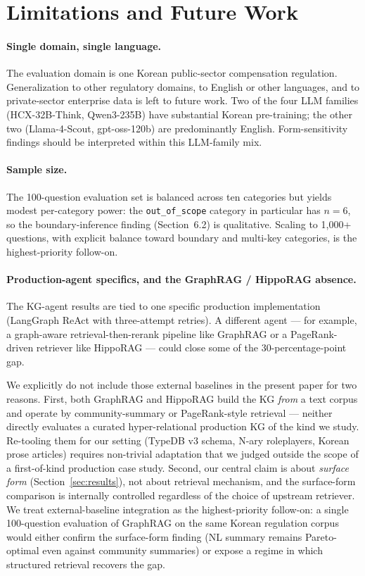 \section{Limitations and Future Work}\label{sec:limits}

\paragraph{Single domain, single language.}
The evaluation domain is one Korean public-sector compensation
regulation. Generalization to other regulatory domains, to English
or other languages, and to private-sector enterprise data is left to
future work. Two of the four LLM families (HCX-32B-Think, Qwen3-235B)
have substantial Korean pre-training; the other two (Llama-4-Scout,
gpt-oss-120b) are predominantly English. Form-sensitivity findings
should be interpreted within this LLM-family mix.

\paragraph{Sample size.}
The 100-question evaluation set is balanced across ten categories
but yields modest per-category power: the
\texttt{out\_of\_scope} category in particular has $n=6$, so the
boundary-inference finding (Section~6.2) is qualitative. Scaling
to 1{,}000+ questions, with explicit balance toward boundary and
multi-key categories, is the highest-priority follow-on.

\paragraph{Production-agent specifics, and the GraphRAG / HippoRAG
absence.}
The KG-agent results are tied to one specific production
implementation (LangGraph ReAct with three-attempt retries). A
different agent — for example, a graph-aware retrieval-then-rerank
pipeline like GraphRAG \citep{edge2024graphrag} or a
PageRank-driven retriever like HippoRAG
\citep{gutierrez2024hipporag} — could close some of the
30-percentage-point gap.

We explicitly do not include those external baselines in the present
paper for two reasons. First, both GraphRAG and HippoRAG build the KG
\emph{from} a text corpus and operate by community-summary or
PageRank-style retrieval — neither directly evaluates a curated
hyper-relational production KG of the kind we study. Re-tooling them
for our setting (TypeDB v3 schema, N-ary roleplayers, Korean prose
articles) requires non-trivial adaptation that we judged outside the
scope of a first-of-kind production case study. Second, our central
claim is about \emph{surface form} (Section~\ref{sec:results}), not
about retrieval mechanism, and the surface-form comparison is
internally controlled regardless of the choice of upstream retriever.
We treat external-baseline integration as the highest-priority
follow-on: a single 100-question evaluation of GraphRAG on the same
Korean regulation corpus would either confirm the surface-form
finding (NL summary remains Pareto-optimal even against community
summaries) or expose a regime in which structured retrieval recovers
the gap.

